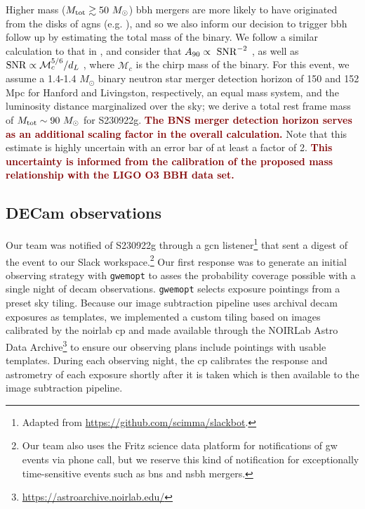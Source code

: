 \documentclass[twocolumn]{aastex631}
\newcommand{\gweventid}{S230922g\xspace}
\newcommand{\gwemopt}{\texttt{gwemopt}\xspace}
\newcommand{\response}[1]{\textbf{\textcolor{maroon}{#1}}}
\begin{document}
Higher mass ($M_{\rm tot} \gtrsim 50~M_\odot$) \gls{bbh} mergers are more likely to have originated from the disks of \glspl{agn} (e.g. \citealt{Gayathri_2021}), and so we also inform our decision to trigger \gls{bbh} follow up by estimating the total mass of the binary.
We follow a similar calculation to that in \citet{grahamCandidateElectromagneticCounterpart2020}, and consider that $A_{90}\propto~{\rm SNR}^{-2}$ \citep{Berry_2015}, as well as ${\rm SNR}\propto \mathcal{M}_c^{5/6}/d_L$ \citep{Finn_1993}, where $\mathcal{M}_c$ is the chirp mass of the binary.
For this event, we assume a 1.4-1.4 $M_\odot$ binary neutron star merger detection horizon of 150 and 152 Mpc for Hanford and Livingston, respectively, an equal mass system, and the luminosity distance marginalized over the sky; we derive a total rest frame mass of $M_{\rm tot} \sim 90~M_\odot$ for \gweventid.
\response{The BNS merger detection horizon serves as an additional scaling factor in the overall calculation.} Note that this estimate is highly uncertain with an error bar of at least a factor of 2. \response{This uncertainty is informed from the calibration of the proposed mass relationship with the LIGO O3 BBH data set.}

\subsection{DECam observations}\label{subsec:observations}

Our team was notified of \gweventid through a \gls{gcn} listener\footnote{Adapted from \url{https://github.com/scimma/slackbot}.} that sent a digest of the event to our Slack workspace.\footnote{Our team also uses the Fritz science data platform \citep{coughlinDataSciencePlatform2023} for notifications of \gls{gw} events via phone call, but we reserve this kind of notification for exceptionally time-sensitive events such as \gls{bns} and \gls{ns}\gls{bh} mergers.}
Our first response was to generate an initial observing strategy with \gwemopt \citep{coughlinOptimizingSearchesElectromagnetic2018} to asses the probability coverage possible with a single night of \gls{decam} observations.
\gwemopt selects exposure pointings from a preset sky tiling.
Because our image subtraction pipeline uses archival \gls{decam} exposures as templates, we implemented a custom tiling based on images calibrated by the \gls{noirlab} \gls{cp} \citep{2014ASPC..485..379V} and made available through the NOIRLab Astro Data Archive\footnote{\url{https://astroarchive.noirlab.edu/}} \citep{2021Mirro...2...33M} to ensure our observing plans include pointings with usable templates.
During each observing night, the \gls{cp} calibrates the response and astrometry of each exposure shortly after it is taken which is then available to the image subtraction pipeline.
\end{document}
